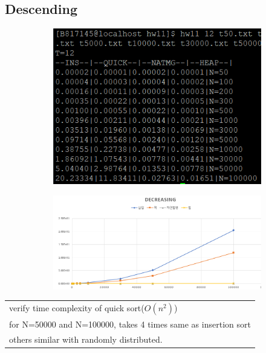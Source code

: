 \documentclass{article}
\begin{document}
\subsection{Descending }
\begin{figure}[H]
\begin{subfigure}[ht]{.3\linewidth}\centering
\includegraphics[width=.9\linewidth]{decreasing2.PNG}
\end{subfigure}
\begin{subfigure}[ht]{.7\linewidth}\centering
\includegraphics[width=.9\linewidth]{decreasing.PNG}
\end{subfigure}
\end{figure}
\begin{table}[H]
\centering
\begin{tabular}{|m{15cm}|}
\hline
verify time complexity of quick sort($O(n^2)$)\\
for N=50000 and N=100000, takes 4 times same as insertion sort\\
others similar with randomly distributed.\\
\hline
\end{tabular}
\end{table}
\end{document}
